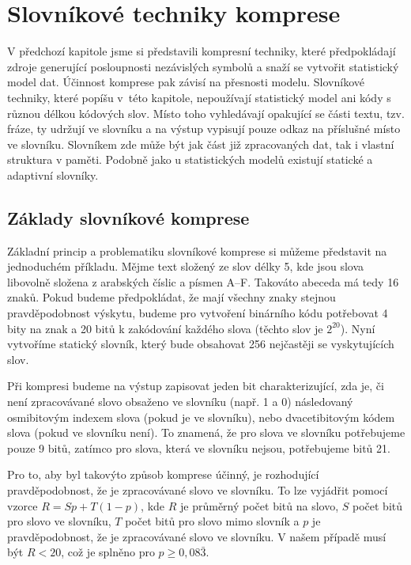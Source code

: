 \chapter{Slovníkové techniky komprese}
\label{kapitolaSlovnikovaKomprese}
V předchozí kapitole jsme si představili kompresní techniky, které předpokládají zdroje generující posloupnosti nezávislých symbolů a snaží se vytvořit statistický model dat. Účinnost komprese pak závisí  na přesnosti modelu. Slovníkové techniky, které popíšu v~této kapitole, nepoužívají statistický model ani kódy s různou délkou kódových slov. Místo toho vyhledávají opakující se části textu, tzv. fráze, ty udržují ve slovníku a na výstup vypisují pouze odkaz na příslušné místo ve slovníku. Slovníkem zde může být jak část již zpracovaných dat, tak i vlastní struktura v paměti. Podobně jako u statistických modelů existují statické a adaptivní slovníky.

\section{Základy slovníkové komprese}
Základní princip a problematiku slovníkové komprese si můžeme představit na jednoduchém příkladu. Mějme text složený ze slov délky 5, kde jsou slova libovolně složena z arabských číslic a písmen A--F. Takováto abeceda má tedy 16 znaků. Pokud budeme předpokládat, že mají všechny znaky stejnou pravděpodobnost výskytu, budeme pro vytvoření binárního kódu potřebovat 4 bity na znak a 20 bitů k zakódování každého slova (těchto slov je $2^{20}$). Nyní vytvoříme statický slovník, který bude obsahovat 256 nejčastěji se vyskytujících slov.

Při kompresi budeme na výstup zapisovat jeden bit charakterizující, zda je, či není zpracovávané slovo obsaženo ve slovníku (např. 1 a 0) následovaný osmibitovým indexem slova (pokud je ve slovníku), nebo dvacetibitovým kódem slova (pokud ve slovníku není). To znamená, že pro slova ve slovníku potřebujeme pouze 9 bitů, zatímco pro slova, která ve slovníku nejsou, potřebujeme bitů 21.

Pro to, aby byl takovýto způsob komprese účinný, je rozhodující pravděpodobnost, že je zpracovávané slovo ve slovníku. To lze vyjádřit pomocí vzorce $R = Sp + T(1-p)$, kde $R$ je průměrný počet bitů na slovo, $S$ počet bitů pro slovo ve slovníku, $T$ počet bitů pro slovo mimo slovník a $p$ je pravděpodobnost, že je zpracovávané slovo ve slovníku. V našem případě musí být $R < 20$, což je splněno pro $p\geq 0,08\bar{3}$.

